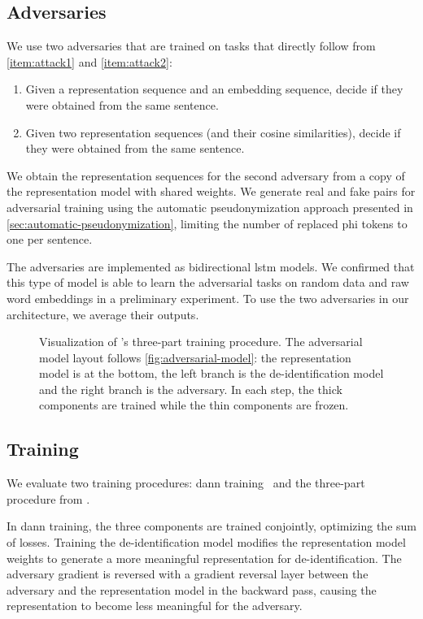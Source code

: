 \subsection{Adversaries}
%
We use two adversaries that are trained on tasks that directly follow from \ref{item:attack1} and \ref{item:attack2}:
\begin{enumerate}[label=T\arabic*.,ref=T\arabic*]
    \item Given a representation sequence and an embedding sequence, decide if they were obtained from the same sentence.
    \item Given two representation sequences (and their cosine similarities), decide if they were obtained from the same sentence.
\end{enumerate}
%
We obtain the representation sequences for the second adversary from a copy of the representation model with shared weights.
%
We generate real and fake pairs for adversarial training using the automatic pseudonymization approach presented in \cref{sec:automatic-pseudonymization}, limiting the number of replaced \ac{phi} tokens to one per sentence.

%
The adversaries are implemented as bidirectional \ac{lstm} models.
%
We confirmed that this type of model is able to learn the adversarial tasks on random data and raw word embeddings in a preliminary experiment.
%
To use the two adversaries in our architecture, we average their outputs.

 \begin{figure}
    \centering
    
    \caption[Adversarial training procedure]{%
        Visualization of \citeauthor{feutry2018learning}'s three-part training procedure.
        The adversarial model layout follows \cref{fig:adversarial-model}: the representation model is at the bottom, the left branch is the de-identification model and the right branch is the adversary.
        In each step, the thick components are trained while the thin components are frozen.
    }\label{fig:feutry-training}
\end{figure}

\subsection{Training}
%
We evaluate two training procedures: \ac{dann} training~\citep{ganin2016domain} and the three-part procedure from \citet{feutry2018learning}.

%
In \ac{dann} training, the three components are trained conjointly, optimizing the sum of losses.
%
Training the de-identification model modifies the representation model weights to generate a more meaningful representation for de-identification.
%
The adversary gradient is reversed with a gradient reversal layer between the adversary and the representation model in the backward pass, causing the representation to become less meaningful for the adversary.

